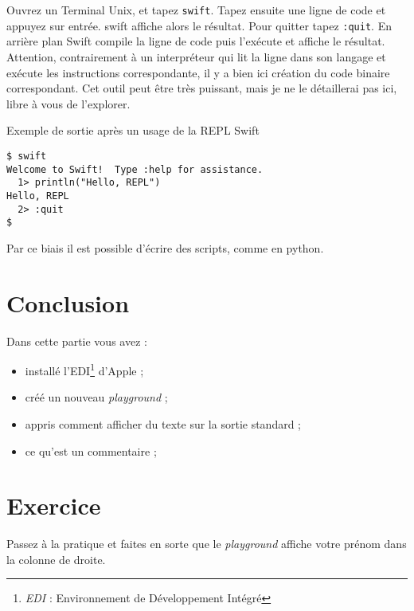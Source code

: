 Ouvrez un Terminal Unix, et tapez \verb"swift".
Tapez ensuite une ligne de code et appuyez sur entrée.
swift affiche alors le résultat.
Pour quitter tapez \verb":quit".
En arrière plan Swift compile la ligne de code
puis l'exécute et affiche le résultat.
Attention, contrairement à un interpréteur qui lit la ligne dans son langage
et exécute les instructions correspondante,
il y a bien ici création du code binaire correspondant.
Cet outil peut être très puissant,
mais je ne le détaillerai pas ici, libre à vous de l’explorer.
\begin{listing}[H]
\caption{Exemple de sortie après un usage de la REPL Swift}
\begin{verbatim}
$ swift
Welcome to Swift!  Type :help for assistance.
  1> println("Hello, REPL")
Hello, REPL
  2> :quit
$
\end{verbatim}
\end{listing}
Par ce biais il est possible d'écrire des scripts, comme en python.



\section*{Conclusion}
{}
Dans cette partie vous avez :
\begin{itemize}
\item installé l'EDI\footnote{\emph{EDI} : Environnement de Développement Intégré} d'Apple ;
\item créé un nouveau \emph{playground} ;
\item appris comment afficher du texte sur la sortie standard ;
\item ce qu'est un commentaire ;
\end{itemize}
\section*{Exercice}
{}
Passez à la pratique et faites en sorte que le \emph{playground} affiche
votre prénom dans la colonne de droite.
